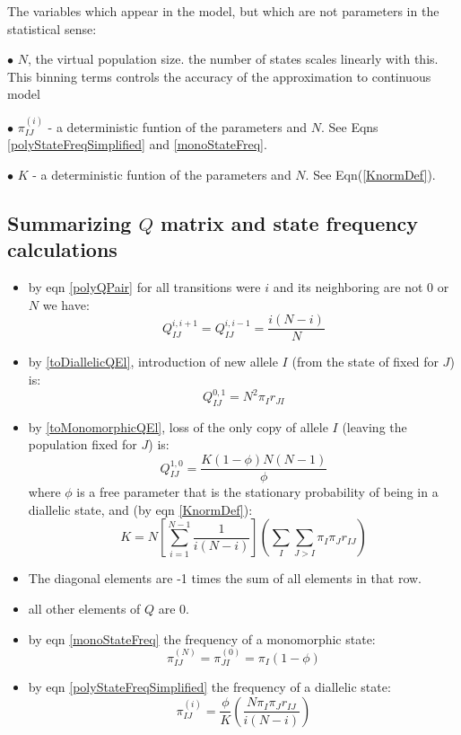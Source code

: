 \documentclass{llncs}
\newcommand{\virtPopSize}{\ensuremath{N}}
\newcommand{\polyProb}{\ensuremath{\phi}}
\newcommand{\Knorm}{\ensuremath{K}}
\begin{document}
The variables which appear in the model, but which are not parameters in the statistical sense:
\begin{compactitem}
    \item[$\bullet$] $\virtPopSize$, the virtual population size. the number of states scales linearly with this.
    This binning terms controls the accuracy of the approximation to continuous model 
    \item[$\bullet$] $\pi_{IJ}^{(i)}$ - a deterministic funtion of the parameters and \virtPopSize. See Eqns \ref{polyStateFreqSimplified} and \ref{monoStateFreq}.
    \item[$\bullet$] $\Knorm$ - a deterministic funtion of the parameters and \virtPopSize. See Eqn(\ref{KnormDef}).
\end{compactitem}

\subsection*{Summarizing $Q$ matrix and state frequency calculations}
\begin{itemize}
  \item by eqn \ref{polyQPair} for all transitions were $i$ and its neighboring are not $0$ or $N$ we have:
    $$Q_{IJ}^{i,i+1} = Q_{IJ}^{i,i-1} = \frac{i(N-i)}{N}$$
  \item by \ref{toDiallelicQEl}, introduction of new allele $I$ (from the state of fixed for $J$) is:
    $$Q_{IJ}^{0,1} = N^2 \pi_I r_{JI} $$ 
  \item by \ref{toMonomorphicQEl}, loss of the only copy of allele $I$ (leaving the population fixed for $J$) is: 
    $$Q_{IJ}^{1,0} =  \frac{\Knorm (1-\polyProb)N(N-1)}{\polyProb }$$
   where $\polyProb$ is a free parameter that is the stationary probability of being in a diallelic state, and (by eqn \ref{KnormDef}):
    $$\Knorm = N\left[\sum_{i=1}^{N-1} \frac{1}{i(N-i)}\right]\left(\sum_I \sum_{J > I}\pi_I\pi_J r_{IJ}\right) $$
  \item The diagonal elements are -1 times the sum of all elements in that row.
  \item all other elements of $Q$ are 0.
  \item by eqn \ref{monoStateFreq} the frequency of a monomorphic state: 
     $$\pi_{IJ}^{(N)} = \pi_{JI}^{(0)} = \pi_I(1-\polyProb) $$
    \item by eqn \ref{polyStateFreqSimplified} the frequency of a diallelic state: 
     $$\pi_{IJ}^{(i)} = \frac{\polyProb}{\Knorm }\left( \frac{N\pi_I\pi_J r_{IJ}}{i(N-i)}\right) $$
\end{itemize}
\end{document}
